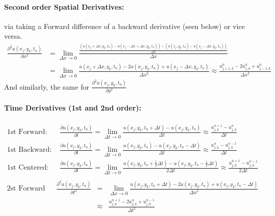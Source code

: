\documentclass{article}
\begin{document}
\paragraph{Second order Spatial Derivatives:} via taking a Forward difference of a backward derivative (seen below) or vice versa.
$$
\begin{aligned}
	\frac{\partial^2 u(x_j, y_k, t_n)}{\partial x^2} &= \lim_{\Delta x \rightarrow 0} \frac{\frac{(u(x_j + \Delta x, y_k, t_n) - u(x_j-\Delta x + \Delta x, y_k, t_n)) - (u(x_j, y_k, t_n) - u(x_j-\Delta x, y_k, t_n))}{\Delta x}}{\Delta x} \\
	&= \lim_{\Delta x \rightarrow 0} \frac{u(x_j + \Delta x, y_k, t_n) - 2u(x_j, y_k, t_n) + u(x_j-\Delta x, y_k, t_n)}{{\Delta x}^2} \approx \frac{u_{j+1, k}^n - 2u_{j,k}^n + u_{j-1,k}^n}{{\Delta x}^2}
\end{aligned}
$$
And similarly, the same for $\frac{\partial^2 u(x_j, y_k, t_n)}{\partial y^2}$

\paragraph{Time Derivatives (1st and 2nd order):}
$$
\begin{aligned}
	\text{1st Forward: } & \frac{\partial u(x_j, y_k, t_n)}{\partial t} = \lim_{\Delta t \rightarrow 0} \frac{u(x_j, y_k, t_n + \Delta t) - u(x_j, y_k, t_n)}{\Delta t} \approx \frac{u_{j,k}^{n+1} - u_{j,k}^n}{\Delta t}\\
	\text{1st Backward: } & \frac{\partial u(x_j, y_k, t_n)}{\partial t} = \lim_{\Delta t \rightarrow 0} \frac{u(x_j, y_k, t_n) - u(x_j, y_k, t_n - \Delta t)}{\Delta t} \approx \frac{u_{j,k}^n - u_{j,k}^{n-1}}{\Delta t}\\
	\text{1st Centered: } & \frac{\partial u(x_j, y_k, t_n)}{\partial t} = \lim_{\Delta t \rightarrow 0} \frac{u(x_j, y_k, t_n + \frac{1}{2} \Delta t) - u(x_j, y_k, t_n - \frac{1}{2} \Delta t)}{2 \Delta t} \approx \frac{u_{j,k}^{n+1} - u_{j, k}^{n-1}}{2 \Delta t} \\
\end{aligned}
$$
$$
\begin{aligned}
	\text{2st Forward of Backward: } & \frac{\partial^2 u(x_j, y_k, t_n)}{\partial t^2} &=& \lim_{\Delta x \rightarrow 0} \frac{u(x_j, y_k, t_n+ \Delta t) - 2u(x_j, y_k, t_n) + u(x_j, y_k, t_n-\Delta t)}{{\Delta n}^2} \\
	& & \approx & \frac{u_{j, k}^{n+1} - 2u_{j,k}^n + u_{j,k}^{n-1}}{{\Delta t}^2}\\
\end{aligned}
$$
\end{document}
